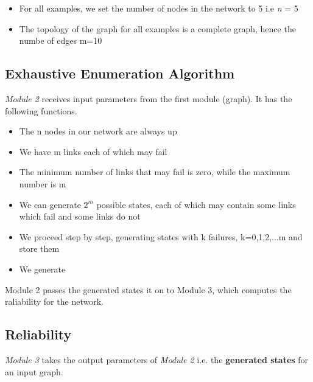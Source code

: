\documentclass[12pt,letterpaper,titlepage,en-US]{article}
\begin{document}
\begin{itemize}
\item For all examples, we set the number of nodes in the network to 5 i.e \textit{n} = 5

\item The topology of the graph for all examples is a complete graph, hence the numbe of edges m=10



\end{itemize}




\subsection{Exhaustive Enumeration Algorithm}
\textit{Module 2} receives input parameters from the first module (graph). It has the following functions.


\begin{itemize}
\item The n nodes in our network are always up
\item We have m links each of which may fail
\item The minimum number of links that may fail is zero, while the maximum number is m
\item We can generate $2^{m}$ possible states, each of which may contain some links which fail and some links do not
\item We proceed step by step, generating states with k failures, k=0,1,2,...m and store them
\item We generate 
\end{itemize}

Module 2  passes the generated states it on to Module 3, which computes the raliability for the network.



\subsection{Reliability}

\textit{Module 3} takes the output parameters of \textit{Module 2} i.e. the \textbf{generated states} for an input graph.
\end{document}
